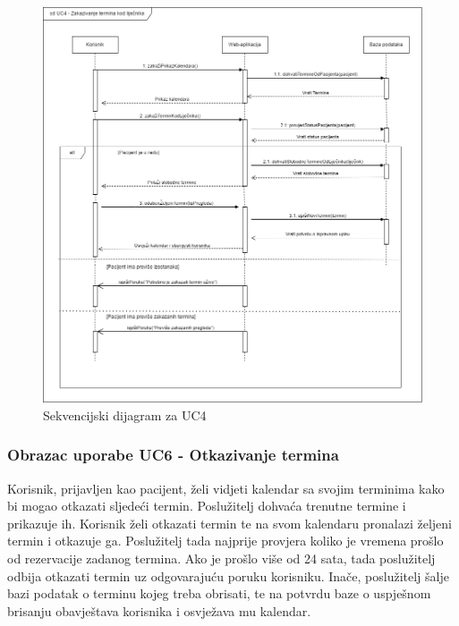 				
				\begin{figure}[H]
			            \includegraphics[width=\textwidth]{slike/sd_uc4.png} %
			            \caption{Sekvencijski dijagram za UC4}
			            \label{fig:promjene2} %
		            \end{figure}
		            
		        \eject
				
				\subsubsection{Obrazac uporabe UC6 - Otkazivanje termina}
				
				Korisnik, prijavljen kao pacijent, želi vidjeti kalendar sa svojim terminima kako bi mogao otkazati sljedeći termin. Poslužitelj dohvaća trenutne termine i prikazuje ih. Korisnik želi otkazati termin te na svom kalendaru pronalazi željeni termin i otkazuje ga. Poslužitelj tada najprije provjera koliko je vremena prošlo od rezervacije zadanog termina. Ako je prošlo više od 24 sata, tada poslužitelj odbija otkazati termin uz odgovarajuću poruku korisniku. Inače, poslužitelj šalje bazi podatak o terminu kojeg treba obrisati, te na potvrdu baze o uspješnom brisanju obavještava korisnika i osvježava mu kalendar.
				
